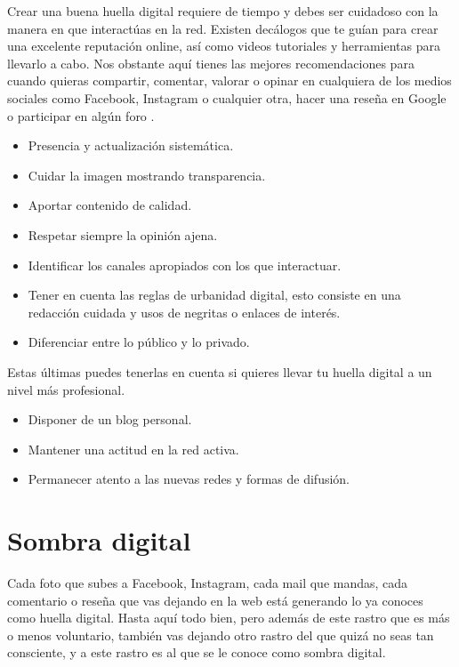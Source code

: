 \documentclass[
  a4paper,
  openany]{book}
\begin{document}
Crear una buena huella digital requiere de tiempo y debes ser cuidadoso con la manera en que interactúas en la red. Existen decálogos que te guían para crear una excelente reputación online, así como videos tutoriales y herramientas para llevarlo a cabo. Nos obstante aquí tienes las mejores recomendaciones para cuando quieras compartir, comentar, valorar o opinar en cualquiera de los medios sociales como Facebook, Instagram o cualquier otra, hacer una reseña en Google o participar en algún foro \citep{decalogo-digital}.

\begin{itemize}
\item
  Presencia y actualización sistemática.
\item
  Cuidar la imagen mostrando transparencia.
\item
  Aportar contenido de calidad.
\item
  Respetar siempre la opinión ajena.
\item
  Identificar los canales apropiados con los que interactuar.
\item
  Tener en cuenta las reglas de urbanidad digital, esto consiste en una redacción cuidada y usos de negritas o enlaces de interés.
\item
  Diferenciar entre lo público y lo privado.
\end{itemize}

Estas últimas puedes tenerlas en cuenta si quieres llevar tu huella digital a un nivel más profesional.

\begin{itemize}
\item
  Disponer de un blog personal.
\item
  Mantener una actitud en la red activa.
\item
  Permanecer atento a las nuevas redes y formas de difusión.
\end{itemize}

\hypertarget{sombra-digital}{%
\section{Sombra digital}\label{sombra-digital}}

Cada foto que subes a Facebook, Instagram, cada mail que mandas, cada comentario o reseña que vas dejando en la web está generando lo ya conoces como huella digital. Hasta aquí todo bien, pero además de este rastro que es más o menos voluntario, también vas dejando otro rastro del que quizá no seas tan consciente, y a este rastro es al que se le conoce como sombra digital.
\end{document}
